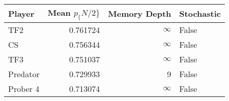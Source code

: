 \begin{tabular}{lrrl}
\toprule
   Player &  Mean $p_\{N/2\}$ &  Memory Depth & Stochastic \\
\midrule
      TF2 &        0.761724 &            \(\infty\) &      False \\
       CS &        0.756344 &            \(\infty\) &      False \\
      TF3 &        0.751037 &            \(\infty\) &      False \\
 Predator &        0.729933 &             9 &      False \\
 Prober 4 &        0.713074 &            \(\infty\) &      False \\
\bottomrule
\end{tabular}
